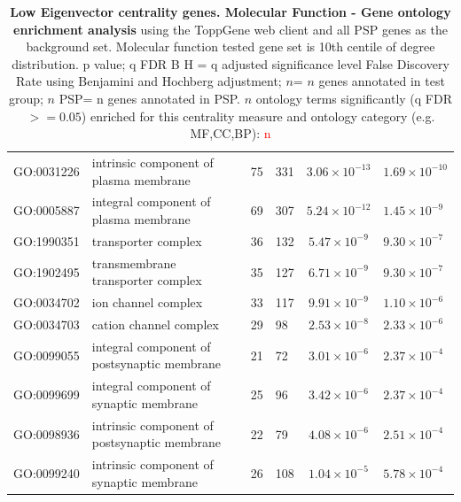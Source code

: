 \begin{table}[ht]
\begin{adjustbox}{width=\textwidth}
\begin{tabular}{@{}clllcl@{}}
  \midrule
GO:0031226 & intrinsic component of plasma membrane & 75 & 331 & $3.06 \times 10^{-13}$ & $1.69 \times 10^{-10}$ \\ 
  GO:0005887 & integral component of plasma membrane & 69 & 307 & $5.24 \times 10^{-12}$ & $1.45 \times 10^{-9}$ \\ 
  GO:1990351 & transporter complex & 36 & 132 & $5.47 \times 10^{-9}$ & $9.30 \times 10^{-7}$ \\ 
  GO:1902495 & transmembrane transporter complex & 35 & 127 & $6.71 \times 10^{-9}$ & $9.30 \times 10^{-7}$ \\ 
  GO:0034702 & ion channel complex & 33 & 117 & $9.91 \times 10^{-9}$ & $1.10 \times 10^{-6}$ \\ 
  GO:0034703 & cation channel complex & 29 & 98 & $2.53 \times 10^{-8}$ & $2.33 \times 10^{-6}$ \\ 
  GO:0099055 & integral component of postsynaptic membrane & 21 & 72 & $3.01 \times 10^{-6}$ & $2.37 \times 10^{-4}$ \\ 
  GO:0099699 & integral component of synaptic membrane & 25 & 96 & $3.42 \times 10^{-6}$ & $2.37 \times 10^{-4}$ \\ 
  GO:0098936 & intrinsic component of postsynaptic membrane & 22 & 79 & $4.08 \times 10^{-6}$ & $2.51 \times 10^{-4}$ \\ 
  GO:0099240 & intrinsic component of synaptic membrane & 26 & 108 & $1.04 \times 10^{-5}$ & $5.78 \times 10^{-4}$ \\ 
   \bottomrule
\end{tabular}
\end{adjustbox}
\caption[Gene ontology enrichment Low Eigenvector centrality genes Molecular Function of genes above 10th centile of distribution]{\textbf{Low Eigenvector centrality genes. Molecular Function - Gene ontology enrichment analysis} using the ToppGene web client and all PSP genes as the background set.  Molecular function tested gene set is 10th centile of degree distribution.  p value; q FDR B H = q adjusted significance level False Discovery Rate using Benjamini and Hochberg adjustment; $n$= $n$ genes annotated in test group; $n$ PSP= n genes annotated in PSP. $n$ ontology terms significantly (q FDR$>=0.05$) enriched for this centrality measure and ontology category (e.g. MF,CC,BP): \textcolor{red}{n}} 

\label{tab:ToppGENE GO: Cellular Component. 10 centile cw psp eig.txtp = p value; q FDR B H = q adjusted significance level False Discovery Rate using Benjamini and Hochberg adjustment; n= n genes annotated in test group; n PSP= n genes annotated in PSP}
\end{table}


